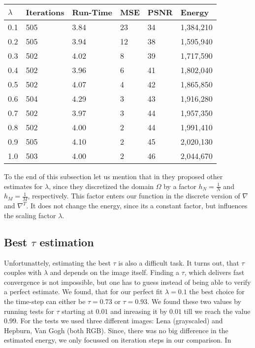         \begin{center}
            \begin{tabular}{| l | l | l | l | l | l |}
            \hline
            $\lambda$ & Iterations & Run-Time & MSE & PSNR & Energy \\ \hline\hline
            0.1 & 505 & 3.84 & 23 & 34 & 1,384,210 \\ \hline
            0.2 & 505 & 3.94 & 12 & 38 & 1,595,940 \\ \hline
            0.3 & 502 & 4.02 & 8 & 39 & 1,717,590 \\ \hline
            0.4 & 502 & 3.96 & 6 & 41 & 1,802,040 \\ \hline
            0.5 & 502 & 4.07 & 4 & 42 & 1,865,850 \\ \hline
            0.6 & 504 & 4.29 & 3 & 43 & 1,916,280 \\ \hline
            0.7 & 502 & 3.97 & 3 & 44 & 1,957,350 \\ \hline
            0.8 & 502 & 4.00 & 2 & 44 & 1,991,410 \\ \hline
            0.9 & 505 & 4.10 & 2 & 45 & 2,020,130 \\ \hline
            1.0 & 503 & 4.00 & 2 & 46 & 2,044,670 \\ \hline
            \end{tabular}
            \label{tab:best_fit_compare}
        \end{center}

    To the end of this subsection let us mention that in \cite{Chambolle10afirst-order} they proposed other estimates for $\lambda$, since they discretized the domain $\Omega$ by a factor $h_{N} = \frac{1}{N}$ and $h_{M} = \frac{1}{M}$, respectively. This factor enters our function in the discrete version of $\nabla$ and $\nabla^{T}$. It does not change the energy, since its a constant factor, but influences the scaling factor $\lambda$.

    \subsection{Best $\tau$ estimation}
    \label{sub:best_tau_estimation_rof}

        Unfortunattely, estimating the best $\tau$ is also a difficult task. It turns out, that $\tau$ couples with $\lambda$ and depends on the image itself. Finding a $\tau$, which delivers fast convergence is not impossible, but one has to guess instead of being able to verify a perfect estimate. We found, that for our perfect fit $\lambda = 0.1$ the best choice for the time-step can either be $\tau = 0.73$ or $\tau = 0.93$. We found these two values by running tests for $\tau$ starting at $0.01$ and inreasing it by $0.01$ till we reach the value $0.99$. For the tests we used three different images: Lena (grayscaled) and Hepburn, Van Gogh (both RGB). Since, there was no big difference in the estimated energy, we only focussed on iteration steps in our comparison. In

